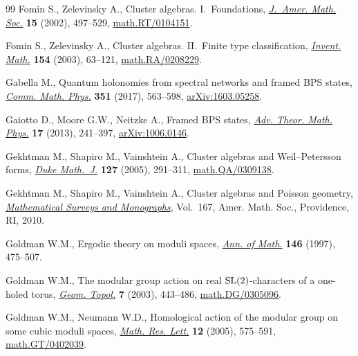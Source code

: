 \documentclass[pdftex]{sigma}
\numberwithin{equation}{section}
\begin{document}
\begin{thebibliography}{99}
Fomin S., Zelevinsky A., Cluster algebras. {I}.~{F}oundations, \href{https://doi.org/10.1090/S0894-0347-01-00385-X}{\textit{J.~Amer.
 Math. Soc.}} \textbf{15} (2002), 497--529, \href{https://arxiv.org/abs/math.RT/0104151}{math.RT/0104151}.

Fomin S., Zelevinsky A., Cluster algebras. {II}.~{F}inite type classification,
 \href{https://doi.org/10.1007/s00222-003-0302-y}{\textit{Invent. Math.}} \textbf{154} (2003), 63--121,
 \href{https://arxiv.org/abs/math.RA/0208229}{math.RA/0208229}.

Gabella M., Quantum holonomies from spectral networks and framed {BPS} states,
 \href{https://doi.org/10.1007/s00220-016-2729-1}{\textit{Comm. Math. Phys.}} \textbf{351} (2017), 563--598,
 \href{https://arxiv.org/abs/1603.05258}{arXiv:1603.05258}.

Gaiotto D., Moore G.W., Neitzke A., Framed {BPS} states, \href{https://doi.org/10.4310/ATMP.2013.v17.n2.a1}{\textit{Adv. Theor.
 Math. Phys.}} \textbf{17} (2013), 241--397, \href{https://arxiv.org/abs/1006.0146}{arXiv:1006.0146}.

Gekhtman M., Shapiro M., Vainshtein A., Cluster algebras and
 {W}eil--{P}etersson forms, \href{https://doi.org/10.1215/S0012-7094-04-12723-X}{\textit{Duke Math.~J.}} \textbf{127} (2005),
 291--311, \href{https://arxiv.org/abs/math.QA/0309138}{math.QA/0309138}.

Gekhtman M., Shapiro M., Vainshtein A., Cluster algebras and {P}oisson
 geometry, \href{https://doi.org/10.1090/surv/167}{\textit{Mathematical Surveys and Monographs}}, Vol.~167, Amer. Math.
 Soc., Providence, RI, 2010.

Goldman W.M., Ergodic theory on moduli spaces, \href{https://doi.org/10.2307/2952454}{\textit{Ann. of Math.}}
 \textbf{146} (1997), 475--507.

Goldman W.M., The modular group action on real {${\rm SL}(2)$}-characters of a
 one-holed torus, \href{https://doi.org/10.2140/gt.2003.7.443}{\textit{Geom. Topol.}} \textbf{7} (2003), 443--486,
 \href{https://arxiv.org/abs/math.DG/0305096}{math.DG/0305096}.

Goldman W.M., Neumann W.D., Homological action of the modular group on some
 cubic moduli spaces, \href{https://doi.org/10.4310/MRL.2005.v12.n4.a11}{\textit{Math. Res. Lett.}} \textbf{12} (2005), 575--591,
 \href{https://arxiv.org/abs/math.GT/0402039}{math.GT/0402039}.


\end{thebibliography}
\end{document}

